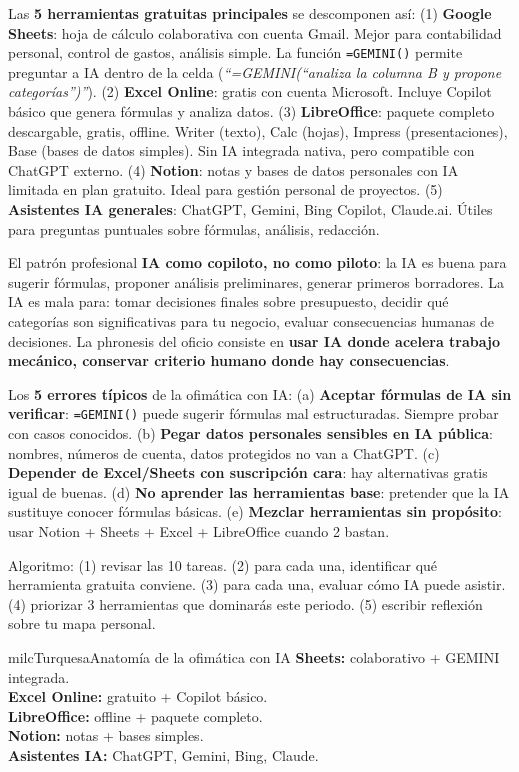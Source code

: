 \documentclass[11pt,letterpaper]{article}
\newcommand{\milcpaso}[3]{%
\Needspace{4\baselineskip}%
\begin{tcolorbox}[enhanced,colback=white,colframe=milcLinea,arc=1.5mm,boxrule=.9pt,
  left=14mm,right=4mm,top=3mm,bottom=3mm,before skip=4pt,after skip=4pt,
  fontupper=\RaggedRight,
  overlay={\node[anchor=north west,circle,fill=#2,text=white,inner sep=0pt,
    minimum size=7.4mm,font=\sffamily\bfseries\small]
    at ([xshift=3.6mm,yshift=-3.2mm]frame.north west) {#1};}]
#3
\end{tcolorbox}}
\begin{document}
\milcpaso{1}{milcTurquesa}{Las \textbf{5 herramientas gratuitas principales} se descomponen así: (1) \textbf{Google Sheets}: hoja de cálculo colaborativa con cuenta Gmail. Mejor para contabilidad personal, control de gastos, análisis simple. La función \texttt{=GEMINI()} permite preguntar a IA dentro de la celda (\emph{``=GEMINI(``analiza la columna B y propone categorías'')''}). (2) \textbf{Excel Online}: gratis con cuenta Microsoft. Incluye Copilot básico que genera fórmulas y analiza datos. (3) \textbf{LibreOffice}: paquete completo descargable, gratis, offline. Writer (texto), Calc (hojas), Impress (presentaciones), Base (bases de datos simples). Sin IA integrada nativa, pero compatible con ChatGPT externo. (4) \textbf{Notion}: notas y bases de datos personales con IA limitada en plan gratuito. Ideal para gestión personal de proyectos. (5) \textbf{Asistentes IA generales}: ChatGPT, Gemini, Bing Copilot, Claude.ai. Útiles para preguntas puntuales sobre fórmulas, análisis, redacción.}
\milcpaso{2}{milcTurquesa}{El patrón profesional \textbf{IA como copiloto, no como piloto}: la IA es buena para sugerir fórmulas, proponer análisis preliminares, generar primeros borradores. La IA es mala para: tomar decisiones finales sobre presupuesto, decidir qué categorías son significativas para tu negocio, evaluar consecuencias humanas de decisiones. La phronesis del oficio consiste en \textbf{usar IA donde acelera trabajo mecánico, conservar criterio humano donde hay consecuencias}.}
\milcpaso{3}{milcTurquesa}{Los \textbf{5 errores típicos} de la ofimática con IA: (a) \textbf{Aceptar fórmulas de IA sin verificar}: \texttt{=GEMINI()} puede sugerir fórmulas mal estructuradas. Siempre probar con casos conocidos. (b) \textbf{Pegar datos personales sensibles en IA pública}: nombres, números de cuenta, datos protegidos no van a ChatGPT. (c) \textbf{Depender de Excel/Sheets con suscripción cara}: hay alternativas gratis igual de buenas. (d) \textbf{No aprender las herramientas base}: pretender que la IA sustituye conocer fórmulas básicas. (e) \textbf{Mezclar herramientas sin propósito}: usar Notion + Sheets + Excel + LibreOffice cuando 2 bastan.}
\milcpaso{4}{milcTurquesa}{Algoritmo: (1) revisar las 10 tareas. (2) para cada una, identificar qué herramienta gratuita conviene. (3) para cada una, evaluar cómo IA puede asistir. (4) priorizar 3 herramientas que dominarás este periodo. (5) escribir reflexión sobre tu mapa personal.}

\begin{drawbox}{milcTurquesa}{Anatomía de la ofimática con IA}
\textbf{Sheets:} colaborativo + GEMINI integrada. \\[1mm] \textbf{Excel Online:} gratuito + Copilot básico. \\[1mm] \textbf{LibreOffice:} offline + paquete completo. \\[1mm] \textbf{Notion:} notas + bases simples. \\[1mm] \textbf{Asistentes IA:} ChatGPT, Gemini, Bing, Claude.
\end{drawbox}
\end{document}
